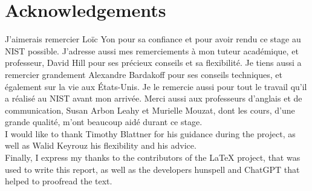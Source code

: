 
\clearpage{}
\pagestyle{empty}
\section*{Acknowledgements}

J'aimerais remercier Loïc Yon pour sa confiance et pour avoir rendu ce stage au
NIST possible. J'adresse aussi mes remerciements à mon tuteur académique, et
professeur, David Hill pour ses précieux conseils et sa flexibilité. Je tiens
aussi a remercier grandement Alexandre Bardakoff pour ses conseils techniques,
et également sur la vie aux États-Unis. Je le remercie aussi pour tout le
travail qu'il a réalisé au NIST avant mon arrivée. Merci aussi aux professeurs
d'anglais et de communication, Susan Arbon Leahy et Murielle Mouzat, dont les
cours, d'une grande qualité, m'ont beaucoup aidé durant ce stage.\\

I would like to thank Timothy Blattner for his guidance during the project, as
well as Walid Keyrouz his flexibility and his advice.\\

Finally, I express my thanks to the contributors of the \LaTeX{} project, that
was used to write this report, as well as the developers hunspell and ChatGPT
that helped to proofread the text.

\clearpage{}
